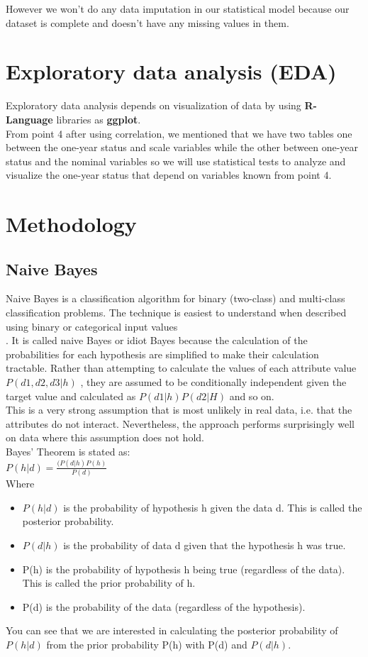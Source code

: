 \documentclass[a4paper, 11pt, oneside]{article} %
\begin{document}
However we won’t do any data imputation in our statistical model because our dataset is complete and doesn’t have any missing values in them.

\section{Exploratory data analysis (EDA)}
Exploratory data analysis depends on visualization of data by using \textbf { R-Language} libraries  as \textbf {ggplot}.\\
From point 4 after using correlation, we mentioned that we have two tables one between the one-year status and scale variables while the other between one-year status and the nominal variables so we will use statistical tests to analyze and visualize the one-year status that depend on variables known from point 4.\cite{datacamp} 

\section{Methodology}

\subsection{Naive Bayes} 
 Naive Bayes is a classification algorithm for binary (two-class) and multi-class classification problems. The technique is easiest to understand when described using binary or categorical input values\\.
It is called naive Bayes or idiot Bayes because the calculation of the probabilities for each hypothesis are simplified to make their calculation tractable. Rather than attempting to calculate the values of each attribute value $P(d1, d2, d3|h)$ , they are assumed to be conditionally independent given the target value and calculated as $P(d1|h)P(d2|H)$ and so on.\\
This is a very strong assumption that is most unlikely in real data, i.e. that the attributes do not interact. Nevertheless, the approach performs surprisingly well on data where this assumption does not hold.\cite{analyticsvidhya2} \\
Bayes’ Theorem is stated as: 
\\
$P(h|d) = \frac { (P(d|h)P(h)}{P(d)}$\\
Where\\
\begin{itemize}
\item$P(h|d)$ is the probability of hypothesis h given the data d. This is called the posterior probability.
\item$P(d|h)$ is the probability of data d given that the hypothesis h was true.
\item P(h) is the probability of hypothesis h being true (regardless of the data). This is called the prior probability of h.
\item P(d) is the probability of the data (regardless of the hypothesis).
\end{itemize}
You can see that we are interested in calculating the posterior probability of $P(h|d)$ from the prior probability P(h) with P(d) and $P(d|h)$.\\
\end{document}
